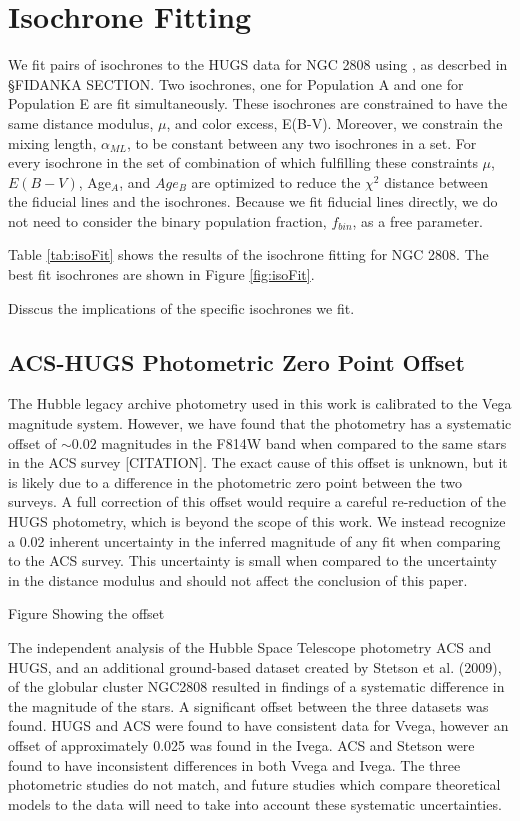 \section{Isochrone Fitting}\label{sec:isoFit}
We fit pairs of isochrones to the HUGS data for NGC 2808 using \fidanka, as
descrbed in \S {\color{red}FIDANKA SECTION}. Two isochrones, one for Population
A and one for Population E are fit simultaneously. These isochrones are
constrained to have the same distance modulus, $\mu$, and color excess, E(B-V).
Moreover, we constrain the mixing length, $\alpha_{ML}$, to be constant between
any two isochrones in a set. For every isochrone in the set of combination of
which fulfilling these constraints $\mu$, $E(B-V)$, Age$_{A}$, and $Age_{B}$
are optimized to reduce the $\chi^{2}$ distance between the fiducial
line{\color{red}s} and the isochrones. Because we fit fiducial lines directly,
we do not need to consider the binary population fraction, $f_{bin}$, as a free
parameter.

{\color{red}Table \ref{tab:isoFit}} shows the results of the isochrone fitting
for NGC 2808. The best fit isochrones are shown in {\color{red}Figure
\ref{fig:isoFit}.}

{\color{red} Disscus the implications of the specific isochrones we fit.}

\subsection{ACS-HUGS Photometric Zero Point Offset}
The Hubble legacy archive photometry used in this work is calibrated to the
Vega magnitude system. However, we have found that the photometry has a
systematic offset of {\color{red}$\sim0.02$ magnitudes} in the F814W band when
compared to the same stars in the ACS survey {\color{red} [CITATION]}. The
exact cause of this offset is unknown, but it is likely due to a difference in
the photometric zero point between the two surveys. A full correction of this
offset would require a careful re-reduction of the HUGS photometry, which is
beyond the scope of this work. We instead recognize a 0.02 inherent uncertainty
in the inferred magnitude of any fit when comparing to the ACS survey. This
uncertainty is {\color{red} small when compared to the uncertainty in the
distance modulus and should not affect the conclusion of this
paper}.

{\color{red} Figure Showing the offset}

{\color{blue}The independent analysis of the Hubble Space Telescope photometry
ACS and HUGS, and an additional ground-based dataset created by Stetson et al.
(2009), of the globular cluster NGC2808 resulted in findings of a systematic
difference in the magnitude of the stars. A significant offset between the
three datasets was found. HUGS and ACS were found to have consistent data for
Vvega, however an offset of approximately 0.025 was found in the Ivega. ACS and
Stetson were found to have inconsistent differences in both Vvega and Ivega.
The three photometric studies do not match, and future studies which compare
theoretical models to the data will need to take into account these systematic
uncertainties. }
